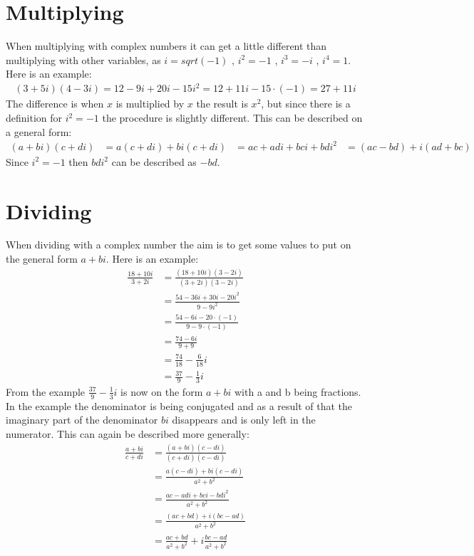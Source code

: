 \section{Multiplying}
When multiplying with complex numbers it can get a little different than multiplying with other variables, as $i=sqrt(-1)$ , $i^2=-1$ , $i^3=-i$ , $i^4=1$. Here is an example: \\
\begin{align*}
(3+5i)(4-3i) = 12 - 9i + 20i - 15i^2 = 12 + 11i - 15 \cdot (-1) = 27 + 11i
\end{align*}
The difference is when $x$ is multiplied by $x$ the result is $x^2$, but since there is a definition for $i^2=-1$ the procedure is slightly different. 
This can be described on a general form:
\begin{align}
(a + bi)(c + di) &= a(c + di) + bi(c + di)
&= ac + adi + bci + bdi^2
&= (ac - bd) + i(ad + bc)
\end{align}
Since $i^2 = -1$ then $bdi^2$ can be described as $-bd$.

\section{Dividing}
When dividing with a complex number the aim is to get some values to put on the general form $a + bi$. Here is an example:
\begin{align*}
\frac{18 + 10i}{3 + 2i} &= \frac{(18 + 10i)(3 - 2i)}{(3+2i)(3-2i)} \\[1em]
&= \frac{54 - 36i + 30i - 20i^2}{9 - 9i^2} \\[1em]
&= \frac{54 - 6i - 20 \cdot (-1)}{9 - 9 \cdot (-1)} \\[1em]
&= \frac{74 - 6i}{9 + 9} \\[1em]
&= \frac{74}{18} - \frac{6}{18}i \\[1em]
&= \frac{37}{9} - \frac{1}{3}i
\end{align*}
From the example $\frac{37}{9} - \frac{1}{3}i$ is now on the form $a+bi$ with a and b being fractions. In the example the denominator is being conjugated and as a result of that the imaginary part of the denominator $bi$ disappears and is only left in the numerator. 
This can again be described more generally:
\begin{align}
\frac{a + bi}{c + di} &= \frac{(a+bi)(c-di)}{(c+di)(c-di)} 	\\[1em]
&= \frac{a(c-di)+bi(c-di)}{a^2+b^2} 							\\[1em]
&= \frac{ac-adi+bci-bdi^2}{a^2+b^2}							\\[1em]
&= \frac{(ac+bd)+i(bc-ad)}{a^2+b^2}							\\[1em]
&= \frac{ac+bd}{a^2+b^2}+i \frac{bc-ad}{a^2+b^2}
\end{align}



